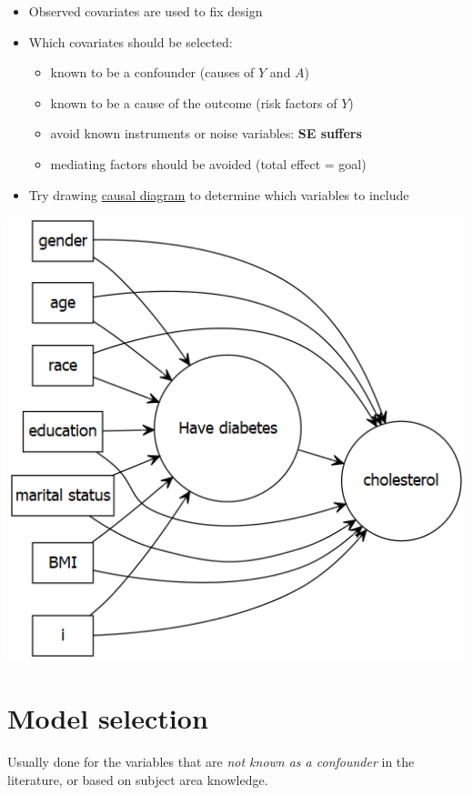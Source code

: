 \documentclass[
]{book}
\providecommand{\tightlist}{%
  \setlength{\itemsep}{0pt}\setlength{\parskip}{0pt}}
\begin{document}
\begin{itemize}
\tightlist
\item
  Observed covariates are used to fix design
\item
  Which covariates should be selected:

  \begin{itemize}
  \tightlist
  \item
    known to be a confounder (causes of \(Y\) and \(A\))
  \item
    known to be a cause of the outcome (risk factors of \(Y\))
  \item
    avoid known instruments or noise variables: \textbf{SE suffers}
  \item
    mediating factors should be avoided (total effect = goal)
  \end{itemize}
\item
  Try drawing \href{http://www.dagitty.net/}{causal diagram} to determine which variables to include
\end{itemize}

\includegraphics[width=0.65\linewidth]{images/overallnhanesplan}

\hypertarget{model-selection}{%
\section{Model selection}\label{model-selection}}

Usually done for the variables that are \emph{not known as a confounder} in the literature, or based on subject area knowledge.
\end{document}
